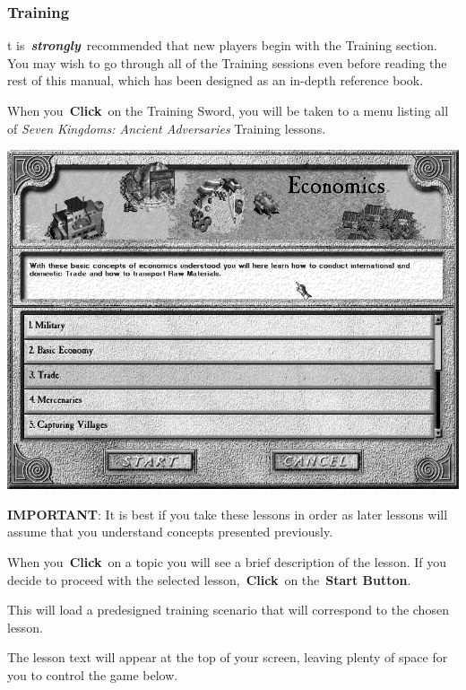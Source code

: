 \clearpage

\subsubsection{Training}


t is \textbf{\textit{strongly}} recommended that new players begin with the Training section. You may wish to go through all of the Training sessions even before reading the rest of this manual, which has been designed as an in-depth reference book.

When you \textbf{Click} on the Training Sword, you will be taken to a menu listing all of \textit{Seven Kingdoms: Ancient Adversaries} Training lessons.

\begin{center}
	\includegraphics[width=0.9\linewidth]{Itraining}
\end{center}

\textbf{IMPORTANT}: It is best if you take these lessons in order as later lessons will assume that you understand concepts presented previously.

When you \textbf{Click} on a topic you will see a brief description of the lesson. If you decide to proceed with the selected lesson, \textbf{Click} on the \textbf{Start Button}.

This will load a predesigned training scenario that will correspond to the chosen lesson.

The lesson text will appear at the top of your screen, leaving plenty of space for you to control the game below.

